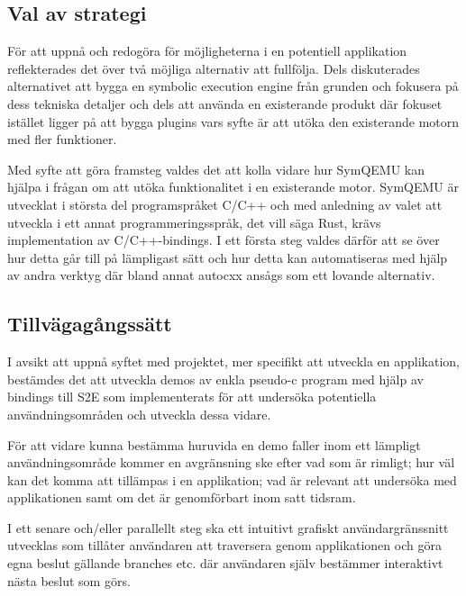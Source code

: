 \subsection{Val av strategi} 
För att uppnå och redogöra för möjligheterna i en
potentiell applikation reflekterades det över två möjliga alternativ att
fullfölja. Dels diskuterades alternativet att bygga en symbolic execution engine
från grunden och fokusera på dess tekniska detaljer och dels att använda en
existerande produkt där fokuset istället ligger på att bygga plugins vars syfte
är att utöka den existerande motorn med fler funktioner. 

Med syfte att göra framsteg valdes det att kolla vidare hur SymQEMU kan hjälpa i
frågan om att utöka funktionalitet i en existerande motor. SymQEMU är utvecklat
i största del programspråket C/C++ och med anledning av valet att utveckla i ett
annat programmeringsspråk, det vill säga Rust, krävs implementation av
C/C++-bindings. I ett första steg valdes därför att  se över hur detta går till
på lämpligast sätt och hur detta kan automatiseras med hjälp av andra verktyg
där bland annat autocxx ansågs som ett lovande alternativ. 

\subsection{Tillvägagångssätt} 
I avsikt att uppnå syftet med projektet, mer
specifikt att utveckla en applikation, bestämdes det att utveckla demos av enkla
pseudo-c program med hjälp av bindings till S2E som implementerats för att
undersöka potentiella användningsområden och utveckla dessa vidare. 

För att vidare kunna bestämma huruvida en demo faller inom ett lämpligt
användningsområde kommer en avgränsning ske efter vad som är rimligt; hur väl
kan det komma att tillämpas i en applikation; vad är relevant att undersöka med
applikationen samt om det är genomförbart inom satt tidsram. 

I ett senare och/eller parallellt steg ska ett intuitivt grafiskt användargränssnitt
utvecklas som tillåter användaren att traversera genom applikationen och göra
egna beslut gällande branches etc. där användaren själv bestämmer interaktivt
nästa beslut som görs. 



%  


